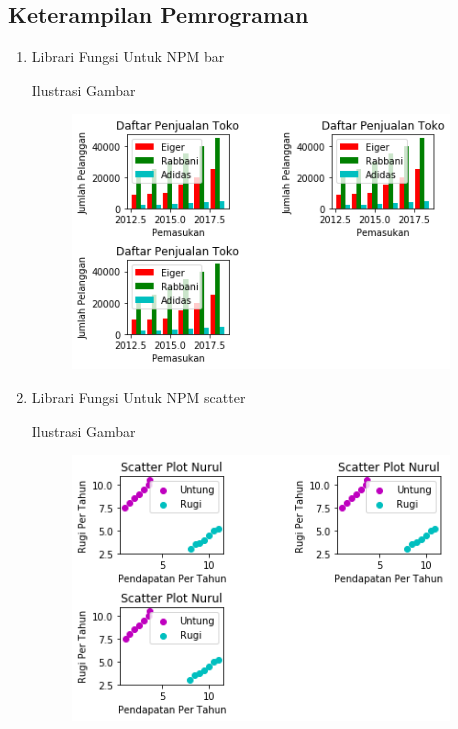 \subsection{Keterampilan Pemrograman}
\begin{enumerate}

\item Librari Fungsi Untuk NPM bar 

Ilustrasi Gambar
	\begin{figure}[ht!]
	\includegraphics[width=10cm]{figures/6/1174062/bar.png}
	\centering
	\end{figure}

\item Librari Fungsi Untuk NPM scatter

Ilustrasi Gambar
	\begin{figure}[ht!]
	\includegraphics[width=10cm]{figures/6/1174062/scatter.png}
	\centering
	\end{figure}


\end{enumerate}
